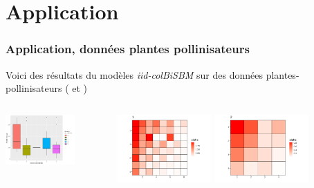 \documentclass{beamer}
\begin{document}
\section{Application}
\begin{frame}
    \frametitle{Application, données plantes pollinisateurs}
    Voici des résultats du modèles \emph{iid-colBiSBM} sur des données 
    plantes-pollinisateurs (\cite{doreRelativeEffectsAnthropogenic2021}
    et \cite{thebaultDatabasePlantpollinatorNetworks2020})
    \begin{columns}
        \begin{column}{0.48\linewidth}
            \includegraphics[scale=0.32]{img/annual_time_span_vs_iid.png}
        \end{column}
        \begin{column}{0.48\linewidth}
            \begin{figure}[H]
                    \includegraphics[width=0.45\textwidth]{img/iid-meso-1.png}
                    \includegraphics[width=0.45\textwidth]{img/iid-meso-2.png}

\end{figure}
\end{column}
\end{columns}
\end{frame}
\end{document}
